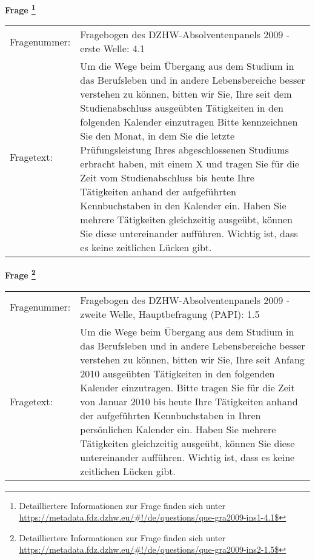 				\vspace*{0.5cm}
                \noindent\textbf{Frage
	                \footnote{Detailliertere Informationen zur Frage finden sich unter
		              \url{https://metadata.fdz.dzhw.eu/\#!/de/questions/que-gra2009-ins1-4.1$}}}\\
				\begin{tabularx}{\hsize}{@{}lX}
					Fragenummer: &
					  Fragebogen des DZHW-Absolventenpanels 2009 - erste Welle:
					  4.1
 \\
					Fragetext: & Um die Wege beim Übergang aus dem Studium in das Berufsleben und in andere Lebensbereiche besser verstehen zu können, bitten wir Sie, Ihre seit dem Studienabschluss ausgeübten Tätigkeiten in den folgenden Kalender einzutragen Bitte kennzeichnen Sie den Monat, in dem Sie die letzte Prüfungsleistung Ihres abgeschlossenen Studiums erbracht haben, mit einem X und tragen Sie für die Zeit vom Studienabschluss bis heute Ihre Tätigkeiten anhand der aufgeführten Kennbuchstaben in den Kalender ein. Haben Sie mehrere Tätigkeiten gleichzeitig ausgeübt, können Sie diese untereinander aufführen. Wichtig ist, dass es keine zeitlichen Lücken gibt. \\
				\end{tabularx}
				\vspace*{0.5cm}
                \noindent\textbf{Frage
	                \footnote{Detailliertere Informationen zur Frage finden sich unter
		              \url{https://metadata.fdz.dzhw.eu/\#!/de/questions/que-gra2009-ins2-1.5$}}}\\
				\begin{tabularx}{\hsize}{@{}lX}
					Fragenummer: &
					  Fragebogen des DZHW-Absolventenpanels 2009 - zweite Welle, Hauptbefragung (PAPI):
					  1.5
 \\
					Fragetext: & Um die Wege beim Übergang aus dem Studium in das Berufsleben und in andere Lebensbereiche besser verstehen zu können, bitten wir Sie, Ihre seit Anfang 2010 ausgeübten Tätigkeiten in den folgenden Kalender einzutragen. Bitte tragen Sie für die Zeit von Januar 2010 bis heute Ihre Tätigkeiten anhand der aufgeführten Kennbuchstaben in Ihren persönlichen Kalender ein. Haben Sie mehrere Tätigkeiten gleichzeitig ausgeübt, können Sie diese untereinander aufführen. Wichtig ist, dass es keine zeitlichen Lücken gibt. \\
				\end{tabularx}

